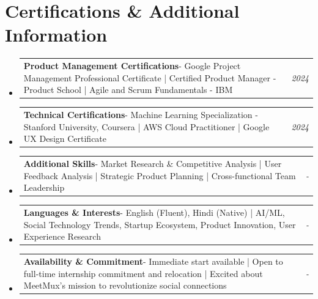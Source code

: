 \documentclass[a4paper,11pt]{article}
\makeatletter
\newcommand{\resumePOR}[3]{
\vspace{0.5mm}\item
    \begin{tabular*}{0.97\textwidth}[t]{l@{\extracolsep{\fill}}r}
        \textbf{#1}\hspace{0.3mm}#2 & \textit{\small{#3}} 
    \end{tabular*}
    \vspace{-2mm}
}
\newcommand{\resumeSubHeadingListStart}{\begin{itemize}[leftmargin=*,labelsep=1mm]}
\newcommand{\resumeSubHeadingListEnd}{\end{itemize}\vspace{2mm}}
\makeatother
\begin{document}
\vspace{-2mm}

\section{\textbf{Certifications \& Additional Information}}
\vspace{-0.2mm}
\resumeSubHeadingListStart
\resumePOR{Product Management Certifications}{- Google Project Management Professional Certificate | Certified Product Manager - Product School | Agile and Scrum Fundamentals - IBM}{2024}
\resumePOR{Technical Certifications}{- Machine Learning Specialization - Stanford University, Coursera | AWS Cloud Practitioner | Google UX Design Certificate}{2024}
\resumePOR{Additional Skills}{- Market Research \& Competitive Analysis | User Feedback Analysis | Strategic Product Planning | Cross-functional Team Leadership}{-}
\resumePOR{Languages \& Interests}{- English (Fluent), Hindi (Native) | AI/ML, Social Technology Trends, Startup Ecosystem, Product Innovation, User Experience Research}{-}
\resumePOR{Availability \& Commitment}{- Immediate start available | Open to full-time internship commitment and relocation | Excited about MeetMux's mission to revolutionize social connections}{-}
\resumeSubHeadingListEnd
\end{document}
